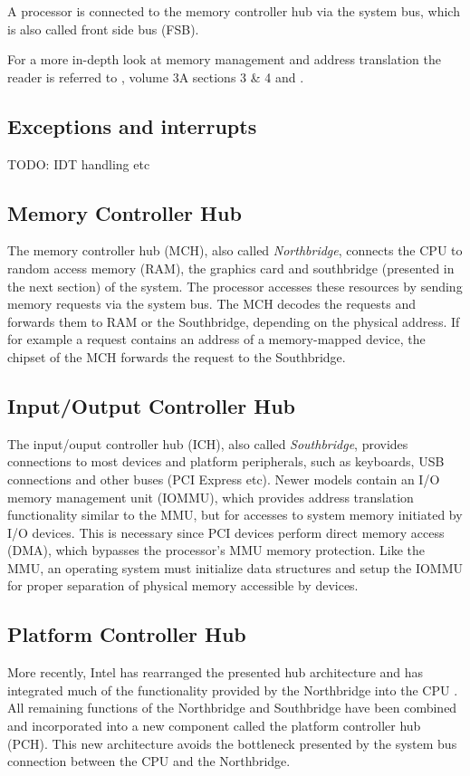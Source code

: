 A processor is connected to the memory controller hub via the system bus, which
is also called front side bus (FSB).

For a more in-depth look at memory management and address translation the reader
is referred to \cite{IntelSDM}, volume 3A sections 3 \& 4 and
\cite{Drepper07whatevery}.

\subsection{Exceptions and interrupts}
TODO: IDT handling etc

\subsection{Memory Controller Hub}
The memory controller hub (MCH), also called
\emph{Northbridge}, connects the CPU to random access memory
(RAM), the graphics card and southbridge (presented in the next section) of the
system. The processor accesses these resources by sending memory requests via
the system bus. The MCH decodes the requests and forwards them to RAM or the
Southbridge, depending on the physical address. If for example a request
contains an address of a memory-mapped device, the chipset of the MCH forwards
the request to the Southbridge.

\subsection{Input/Output Controller Hub}\label{subsec:ich}
The input/ouput controller hub (ICH), also called
\emph{Southbridge}, provides connections to most devices and
platform peripherals, such as keyboards, USB connections and other buses (PCI
Express etc). Newer models contain an I/O memory management unit
(IOMMU), which provides address translation functionality similar
to the MMU, but for accesses to system memory initiated by I/O devices.  This is
necessary since PCI devices perform direct memory access (DMA), which
bypasses the processor's MMU memory protection.  Like the MMU, an operating
system must initialize data structures and setup the IOMMU for proper separation
of physical memory accessible by devices.

\subsection{Platform Controller Hub}
More recently, Intel has rearranged the presented hub architecture and has
integrated much of the functionality provided by the Northbridge into the CPU
\cite{IntelQPI}. All remaining functions of the Northbridge and Southbridge have
been combined and incorporated into a new component called the platform
controller hub (PCH). This new architecture avoids the bottleneck
presented by the system bus connection between the CPU and the Northbridge.

